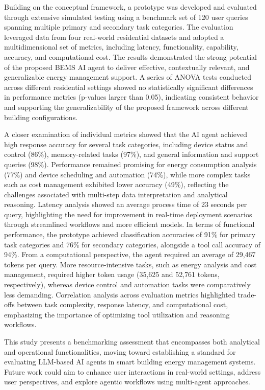 \documentclass[final,3p,times]{elsarticle}
\begin{document}
Building on the conceptual framework, a prototype was developed and evaluated through extensive simulated testing using a benchmark set of 120 user queries spanning multiple primary and secondary task categories. The evaluation leveraged data from four real-world residential datasets and adopted a multidimensional set of metrics, including latency, functionality, capability, accuracy, and computational cost. The results demonstrated the strong potential of the proposed BEMS AI agent to deliver effective, contextually relevant, and generalizable energy management support. A series of ANOVA tests conducted across different residential settings showed no statistically significant differences in performance metrics (p-values larger than 0.05), indicating consistent behavior and supporting the generalizability of the proposed framework across different building configurations.

A closer examination of individual metrics showed that the AI agent achieved high response accuracy for several task categories, including device status and control (86\%), memory-related tasks (97\%), and general information and support queries (98\%). Performance remained promising for energy consumption analysis (77\%) and device scheduling and automation (74\%), while more complex tasks such as cost management exhibited lower accuracy (49\%), reflecting the challenges associated with multi-step data interpretation and analytical reasoning. Latency analysis showed an average process time of 23 seconds per query, highlighting the need for improvement in real-time deployment scenarios through streamlined workflows and more efficient models. In terms of functional performance, the prototype achieved classification accuracies of 91\% for primary task categories and 76\% for secondary categories, alongside a tool call accuracy of 94\%. From a computational perspective, the agent required an average of 29,467 tokens per query. More resource-intensive tasks, such as energy analysis and cost management, required higher token usage (35,625 and 52,761 tokens, respectively), whereas device control and automation tasks were comparatively less demanding. Correlation analysis across evaluation metrics highlighted trade-offs between task complexity, response latency, and computational cost, emphasizing the importance of optimizing tool utilization and reasoning workflows.

This study presents a benchmarking assessment that encompasses both analytical and operational functionalities, moving toward establishing a standard for evaluating LLM-based AI agents in smart building energy management systems. Future work could aim to enhance user interactions in real-world settings, address user perspectives, and explore agentic workflows using multi-agent approaches. 
\end{document}
